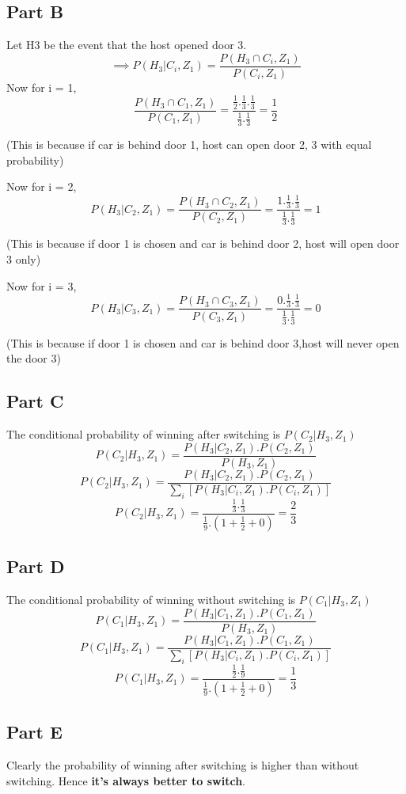 \documentclass[12pt]{article}
\begin{document}
\subsection*{Part B}
Let H3 be the event that the host opened door 3.
$$\implies P(H_3 | C_i,Z_1) = \frac{P(H_3 \cap C_i,Z_1)}{P(C_i,Z_1)}$$
Now for i = 1,
$$\frac{P(H_3 \cap C_1,Z_1)}{P(C_1,Z_1)} = \frac{\frac{1}{2}.\frac{1}{3}.\frac{1}{3}}{\frac{1}{3}.\frac{1}{3}} = \frac{1}{2}$$
\begin{flushright}
(This is because if car is behind door 1, host can open door 2, 3 with equal probability)
\end{flushright}
Now for i = 2,
$$P(H_3 | C_2,Z_1) = \frac{P(H_3 \cap C_2,Z_1)}{P(C_2,Z_1)} = \frac{1.\frac{1}{3}.\frac{1}{3}}{\frac{1}{3}.\frac{1}{3}} = 1$$
\begin{flushright}
(This is because if door 1 is chosen and car is behind door 2, host will open door 3 only)
\end{flushright}
Now for i = 3,
$$P(H_3 | C_3,Z_1) = \frac{P(H_3 \cap C_3,Z_1)}{P(C_3,Z_1)} = \frac{0.\frac{1}{3}.\frac{1}{3}}{\frac{1}{3}.\frac{1}{3}} = 0$$
\begin{flushright}
(This is because if door 1 is chosen and car is behind door 3,host will never open the door 3)
\end{flushright}

\subsection*{Part C}
The conditional probability of winning after switching is $P(C_2 | H_3,Z_1)$
$$P(C_2|H_3,Z_1) = \frac{P(H_3|C_2,Z_1).P(C_2,Z_1)}{P(H_3, Z_1)}$$
$$P(C_2|H_3,Z_1) = \frac{P(H_3|C_2,Z_1).P(C_2,Z_1)}{\sum_i[P(H_3|C_i,Z_1).P(C_i,Z_1)]}$$
$$P(C_2|H_3,Z_1) = \frac{\frac{1}{3}.\frac{1}{3}}{\frac{1}{9}.(1+\frac{1}{2}+0)} = \frac{2}{3}$$
\subsection*{Part D}
The conditional probability of winning without switching is $P(C_1 | H_3,Z_1)$
$$P(C_1|H_3,Z_1) = \frac{P(H_3|C_1,Z_1).P(C_1,Z_1)}{P(H_3, Z_1)}$$
$$P(C_1|H_3,Z_1) = \frac{P(H_3|C_1,Z_1).P(C_1,Z_1)}{\sum_i[P(H_3|C_i,Z_1).P(C_i,Z_1)]}$$
$$P(C_1|H_3,Z_1) = \frac{\frac{1}{2}.\frac{1}{9}}{\frac{1}{9}.(1+\frac{1}{2}+0)} = \frac{1}{3}$$
\subsection*{Part E}
Clearly the probability of winning after switching is higher than without switching. Hence \textbf{it's always better to switch}.
\end{document}
